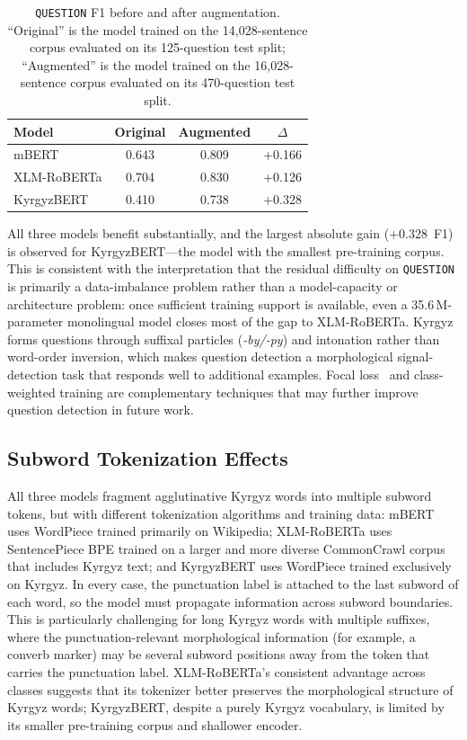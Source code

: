 \documentclass[manuscript, review]{acmart}
\begin{document}
\begin{table}[t]
\centering
\small
\caption{\texttt{QUESTION} F1 before and after augmentation. ``Original'' is the model trained on the 14{,}028-sentence corpus evaluated on its 125-question test split; ``Augmented'' is the model trained on the 16{,}028-sentence corpus evaluated on its 470-question test split.}
\label{tab:question-ablation}
\begin{tabular}{lccc}
\toprule
\textbf{Model} & \textbf{Original} & \textbf{Augmented} & $\Delta$ \\
\midrule
mBERT       & 0.643 & 0.809 & +0.166 \\
XLM-RoBERTa & 0.704 & 0.830 & +0.126 \\
KyrgyzBERT  & 0.410 & 0.738 & +0.328 \\
\bottomrule
\end{tabular}
\end{table}

All three models benefit substantially, and the largest absolute gain (+0.328~F1) is observed for KyrgyzBERT---the model with the smallest pre-training corpus. This is consistent with the interpretation that the residual difficulty on \texttt{QUESTION} is primarily a data-imbalance problem rather than a model-capacity or architecture problem: once sufficient training support is available, even a 35.6\,M-parameter monolingual model closes most of the gap to XLM-RoBERTa. Kyrgyz forms questions through suffixal particles (\textit{-by/-py}) and intonation rather than word-order inversion, which makes question detection a morphological signal-detection task that responds well to additional examples. Focal loss~\cite{lin2017focal} and class-weighted training are complementary techniques that may further improve question detection in future work.

\subsection{Subword Tokenization Effects}

All three models fragment agglutinative Kyrgyz words into multiple subword tokens, but with different tokenization algorithms and training data: mBERT uses WordPiece trained primarily on Wikipedia; XLM-RoBERTa uses SentencePiece BPE trained on a larger and more diverse CommonCrawl corpus that includes Kyrgyz text; and KyrgyzBERT uses WordPiece trained exclusively on Kyrgyz. In every case, the punctuation label is attached to the last subword of each word, so the model must propagate information across subword boundaries. This is particularly challenging for long Kyrgyz words with multiple suffixes, where the punctuation-relevant morphological information (for example, a converb marker) may be several subword positions away from the token that carries the punctuation label. XLM-RoBERTa's consistent advantage across classes suggests that its tokenizer better preserves the morphological structure of Kyrgyz words; KyrgyzBERT, despite a purely Kyrgyz vocabulary, is limited by its smaller pre-training corpus and shallower encoder.
\end{document}
